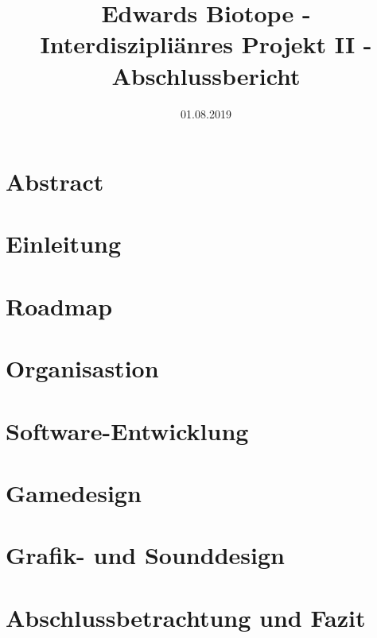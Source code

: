 \documentclass[12pt ,letterpaper]{article}
\title{Edwards Biotope - Interdiszipliänres Projekt II - Abschlussbericht}
\date{01.08.2019}
\begin{document}
\begin{onehalfspace}
\maketitle
\tableofcontents
\section{Abstract}
\section{Einleitung}

\section{Roadmap}

\section{Organisastion}

\section{Software-Entwicklung}



\section{Gamedesign}

\section{Grafik- und Sounddesign} 



\section{Abschlussbetrachtung und Fazit}

\listoffigures
\end{onehalfspace}
\end{document}
